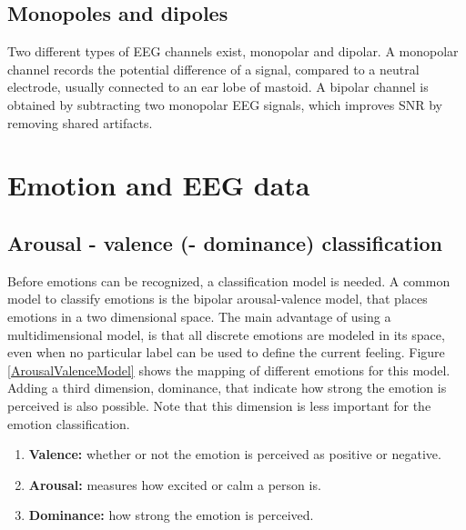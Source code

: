
\subsection{Monopoles and dipoles}
Two different types of EEG channels exist, monopolar and dipolar. A monopolar channel records the potential difference of a signal, compared to a neutral electrode, usually connected to an ear lobe of mastoid. A bipolar channel is obtained by subtracting two monopolar EEG signals, which improves SNR by removing shared artifacts\cite{MonoBiPolar}. 

\section{Emotion and EEG data}

\subsection{Arousal - valence (- dominance) classification}
Before emotions can be recognized, a classification model is needed. A common model to classify emotions is the bipolar arousal-valence model\cite{ExtendedPaper}\cite{RealTimeEEGEmotion}, that places emotions in a two dimensional space. The main advantage of using a multidimensional model, is that all discrete emotions are modeled in its space, even when no particular label can be used to define the current feeling. Figure \ref{ArousalValenceModel} shows the mapping of different emotions for this model. Adding a third dimension, dominance, that indicate how strong the emotion is perceived is also possible\cite{EEGDatasets}. Note that this dimension is less important for the emotion classification.
\begin{enumerate}
\item \textbf{Valence:} whether or not the emotion is perceived as positive or negative.
\item \textbf{Arousal:} measures how excited or calm a person is.
\item \textbf{Dominance:} how strong the emotion is perceived.
\end{enumerate}


